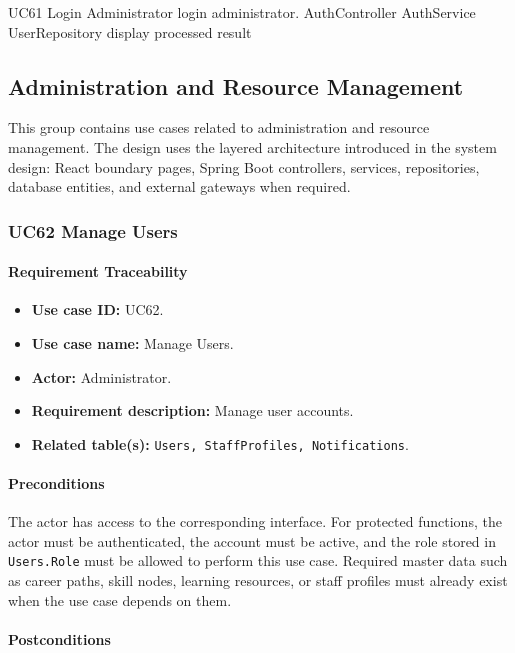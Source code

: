 \SequenceDiagram
{UC61 Login}
{Administrator}
{login administrator.}
{AuthController}
{AuthService}
{UserRepository}
{display processed result}

\subsection{Administration and Resource Management}

This group contains use cases related to administration and resource management. The design uses the layered architecture introduced in the system design: React boundary pages, Spring Boot controllers, services, repositories, database entities, and external gateways when required.

\subsubsection{UC62 Manage Users}

\paragraph{Requirement Traceability}

\begin{itemize}
    \item \textbf{Use case ID:} UC62.
    \item \textbf{Use case name:} Manage Users.
    \item \textbf{Actor:} Administrator.
    \item \textbf{Requirement description:} Manage user accounts.
    \item \textbf{Related table(s):} \texttt{Users, StaffProfiles, Notifications}.
\end{itemize}

\paragraph{Preconditions}

The actor has access to the corresponding interface. For protected functions, the actor must be authenticated, the account must be active, and the role stored in \texttt{Users.Role} must be allowed to perform this use case. Required master data such as career paths, skill nodes, learning resources, or staff profiles must already exist when the use case depends on them.

\paragraph{Postconditions}

